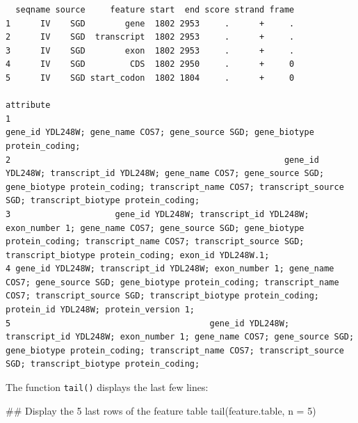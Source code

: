 \documentclass[]{article}
\newenvironment{Shaded}{\begin{snugshade}}{\end{snugshade}}
\newcommand{\KeywordTok}[1]{\textcolor[rgb]{0.94,0.87,0.69}{#1}}
\newcommand{\DataTypeTok}[1]{\textcolor[rgb]{0.87,0.87,0.75}{#1}}
\newcommand{\DecValTok}[1]{\textcolor[rgb]{0.86,0.86,0.80}{#1}}
\newcommand{\NormalTok}[1]{\textcolor[rgb]{0.80,0.80,0.80}{#1}}
\begin{document}
\begin{verbatim}
  seqname source     feature start  end score strand frame
1      IV    SGD        gene  1802 2953     .      +     .
2      IV    SGD  transcript  1802 2953     .      +     .
3      IV    SGD        exon  1802 2953     .      +     .
4      IV    SGD         CDS  1802 2950     .      +     0
5      IV    SGD start_codon  1802 1804     .      +     0
                                                                                                                                                                                                                                    attribute
1                                                                                                                                                              gene_id YDL248W; gene_name COS7; gene_source SGD; gene_biotype protein_coding;
2                                                       gene_id YDL248W; transcript_id YDL248W; gene_name COS7; gene_source SGD; gene_biotype protein_coding; transcript_name COS7; transcript_source SGD; transcript_biotype protein_coding;
3                     gene_id YDL248W; transcript_id YDL248W; exon_number 1; gene_name COS7; gene_source SGD; gene_biotype protein_coding; transcript_name COS7; transcript_source SGD; transcript_biotype protein_coding; exon_id YDL248W.1;
4 gene_id YDL248W; transcript_id YDL248W; exon_number 1; gene_name COS7; gene_source SGD; gene_biotype protein_coding; transcript_name COS7; transcript_source SGD; transcript_biotype protein_coding; protein_id YDL248W; protein_version 1;
5                                        gene_id YDL248W; transcript_id YDL248W; exon_number 1; gene_name COS7; gene_source SGD; gene_biotype protein_coding; transcript_name COS7; transcript_source SGD; transcript_biotype protein_coding;
\end{verbatim}

The function \texttt{tail()} displays the last few lines:

\begin{Shaded}
\begin{Highlighting}[]
\NormalTok{## Display the 5 last rows of the feature table}
\KeywordTok{tail}\NormalTok{(feature.table, }\DataTypeTok{n =} \DecValTok{5}\NormalTok{) }
\end{Highlighting}
\end{Shaded}
\end{document}
